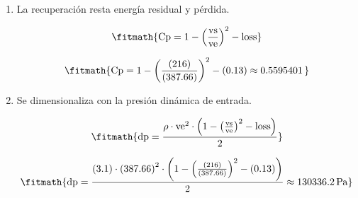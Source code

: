 \begin{enumerate}

\item La recuperación resta energía residual y pérdida.

\[\fitmath{\mathrm{Cp}=1-{\left(\frac{\mathrm{vs}}{\mathrm{ve}}\right)}^{2}-\mathrm{loss}}\]

\[\fitmath{\mathrm{Cp}=1-{\left(\frac{(216)}{(387.66)}\right)}^{2}-(0.13)\approx 0.5595401\,}\]

\item Se dimensionaliza con la presión dinámica de entrada.

\[\fitmath{\mathrm{dp}=\frac{\rho\cdot {\mathrm{ve}}^{2}\cdot \left(1-{\left(\frac{\mathrm{vs}}{\mathrm{ve}}\right)}^{2}-\mathrm{loss}\right)}{2}}\]

\[\fitmath{\mathrm{dp}=\frac{(3.1)\cdot {(387.66)}^{2}\cdot \left(1-{\left(\frac{(216)}{(387.66)}\right)}^{2}-(0.13)\right)}{2}\approx 130336.2\,\mathrm{Pa}}\]

\end{enumerate}
